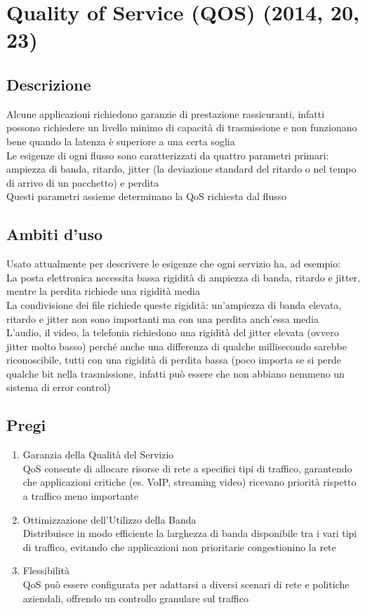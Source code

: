 \documentclass[10pt,oneside,a4paper]{article}
\begin{document}
\section{Quality of Service (QOS) (2014, 20, 23)}
\subsection{Descrizione}
Alcune applicazioni richiedono garanzie di prestazione rassicuranti, infatti possono richiedere un livello minimo di capacità di trasmissione e non funzionano bene quando la latenza è superiore a una certa soglia\\
Le esigenze di ogni flusso sono caratterizzati da quattro parametri primari: ampiezza di banda, ritardo, jitter (la deviazione standard del ritardo o nel tempo di arrivo di un pacchetto) e perdita\\
Questi parametri assieme determinano la QoS richiesta dal flusso
\subsection{Ambiti d'uso}
Usato attualmente per descrivere le esigenze che ogni servizio ha, ad esempio:\\
La posta elettronica necessita bassa rigidità di ampiezza di banda, ritardo e jitter, mentre la perdita richiede una rigidità media\\
La condivisione dei file richiede queste rigidità: un'ampiezza di banda elevata, ritardo e jitter non sono importanti ma con una perdita anch'essa media\\
L'audio, il video, la telefonia richiedono una rigidità del jitter elevata (ovvero jitter molto basso) perché anche una differenza di qualche millisecondo sarebbe riconoscibile, tutti con una rigidità di perdita bassa (poco importa se si perde qualche bit nella trasmissione, infatti può essere che non abbiano nemmeno un sistema di error control)
\subsection{Pregi}
\begin{enumerate}
\item Garanzia della Qualità del Servizio\\
QoS consente di allocare risorse di rete a specifici tipi di traffico, garantendo che applicazioni critiche (es. VoIP, streaming video) ricevano priorità rispetto a traffico meno importante
\item Ottimizzazione dell'Utilizzo della Banda\\
Distribuisce in modo efficiente la larghezza di banda disponibile tra i vari tipi di traffico, evitando che applicazioni non prioritarie congestionino la rete
\item Flessibilità\\
QoS può essere configurata per adattarsi a diversi scenari di rete e politiche aziendali, offrendo un controllo granulare sul traffico
\end{enumerate}
\end{document}
